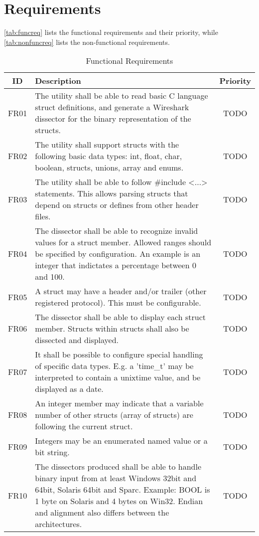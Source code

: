\chapter{Requirements}
\autoref{tab:funcreq} lists the functional requirements and their priority,
while \autoref{tab:nonfuncreq} lists the non-functional requirements.

\begin{table}[h] \center
\caption{Functional Requirements\label{tab:funcreq}}
\begin{tabular}{| c | p{11cm} | c |}
	\hline ID & Description & Priority \\
    \hline FR01 & The utility shall be able to read basic C language struct
		definitions, and generate a Wireshark dissector for the binary
		representation of the structs. & TODO \\
	\hline FR02 & The utility shall support structs with the following basic
		data types: int, float, char, boolean, structs, unions, array and
		enums. & TODO \\
	\hline FR03 & The utility shall be able to follow \#include <...>
		statements. This allows parsing structs that depend on structs or
		defines from other header files. & TODO \\
	\hline FR04 & The dissector shall be able to recognize invalid values for
		a struct member. Allowed ranges should be specified by configuration.
		An example is an integer that indictates a percentage between 0 and
		100. & TODO \\
	\hline FR05 & A struct may have a header and/or trailer (other registered
		protocol). This must be configurable. & TODO \\
	\hline FR06 & The dissector shall be able to display each struct member.
		Structs within structs shall also be dissected and displayed. & TODO \\
	\hline FR07 & It shall be possible to configure special handling of
		specific data types. E.g. a 'time\_t' may be interpreted to contain a
		unixtime value, and be displayed as a date. & TODO \\
	\hline FR08 & An integer member may indicate that a variable number of
		other structs (array of structs) are following the current struct.
		& TODO \\
	\hline FR09 & Integers may be an enumerated named value or a bit string.
		& TODO \\
	\hline FR10 & The dissectors produced shall be able to handle binary input
		from at least Windows 32bit and 64bit, Solaris 64bit and Sparc.
		Example: BOOL is 1 byte on Solaris and 4 bytes on Win32. Endian and
		alignment also differs between the architectures. & TODO \\
	\hline
\end{tabular}
\end{table}


